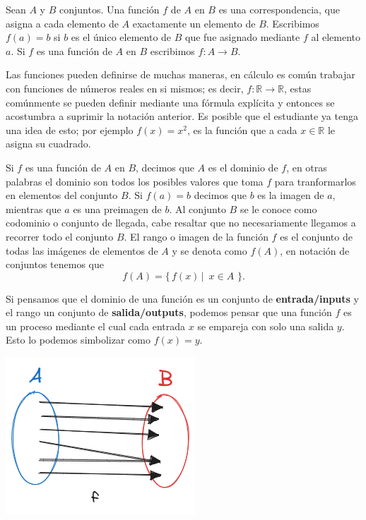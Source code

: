 \begin{definicion}
    Sean $A$ y $B$ conjuntos. Una función $f$ de $A$ en $B$ es una correspondencia, que asigna a cada elemento de $A$ exactamente un elemento de $B$. Escribimos $f(a)=b$ si $b$ es el único elemento de $B$ que fue asignado mediante $f$ al elemento $a$. Si $f$ es una función de $A$ en $B$ escribimos $f: A \longrightarrow B$.
\end{definicion}

Las funciones pueden definirse de muchas maneras, en cálculo es común trabajar con funciones de números reales en si mismos; es decir, $f: \mathbb{R}\longrightarrow \mathbb{R}$, estas comúnmente se pueden definir mediante una fórmula explícita y entonces se acostumbra a suprimir la notación anterior. Es posible que el estudiante ya tenga una idea de esto; por ejemplo $f(x)=x^2$, es la función que a cada $x \in \mathbb{R}$ le asigna su cuadrado.

\begin{definicion}
    Si $f$ es una función de $A$ en $B$, decimos que $A$ es el dominio de $f$, en otras palabras el dominio son todos los posibles valores que toma $f$ para tranformarlos en elementos del conjunto $B$. Si $f(a)=b$ decimos que $b$ es la imagen de $a$, mientras que $a$ es una preimagen de $b$. Al conjunto $B$ se le conoce como codominio o conjunto de llegada, cabe resaltar que no necesariamente llegamos a recorrer todo el conjunto $B$. El rango o imagen de la función $f$ es el conjunto de todas las imágenes de elementos de $A$ y se denota como $f(A)$, en notación de conjuntos tenemos que $$f(A)=\{\, f(x)\,| \,\,\, x \in A\,\,\}.$$
\end{definicion}

Si pensamos que el dominio de una función es un conjunto de \textbf{entrada/inputs} y el rango un conjunto de \textbf{salida/outputs}, podemos pensar que una función $f$ es un proceso mediante el cual cada entrada $x$ se empareja con solo una salida $y$. Esto lo podemos simbolizar como $f(x)=y$.

\begin{center}
    \includegraphics[scale=0.55]{Imagenes/IMG2/S1-2-02.png}
\end{center}


